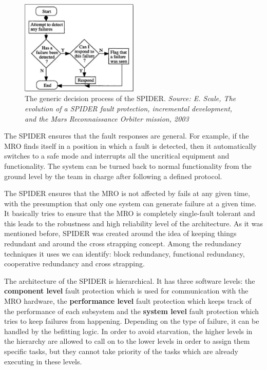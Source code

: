 \begin{figure}[htb]
	\begin{center}
	\includegraphics[width=0.5\textwidth]{img/spider.png}
	\caption{The generic decision process of the SPIDER. \small{\textit{Source: E.
	Scale, The evolution of a {SPIDER} fault protection, incremental development,
	and the {Mars Reconnaissance Orbiter} mission, 2003}}}
	\label{fig:spider}
	\end{center}
\end{figure}

The SPIDER ensures that the fault responses are general. For example, if the MRO
finds itself in a position in which a fault is detected, then it automatically
switches to a safe mode and interrupts all the uncritical equipment and
functionality. The system can be turned back to normal functionality from the
ground level by the team in charge after following a defined protocol.

The SPIDER ensures that the MRO is not affected by fails at any given time, with
the presumption that only one system can generate failure at a given time. It
basically tries to ensure that the MRO is completely single-fault tolerant and
this leads to the robustness and high reliability level of the architecture. As
it was mentioned before, SPIDER was created around the idea of keeping things
redundant and around the cross strapping concept. Among the redundancy
techniques it uses we can identify: block redundancy, functional redundancy,
cooperative redundancy and cross strapping.

The architecture of the SPIDER is hierarchical. It has three software levels:
the \textbf{component level} fault protection which is used for communication
with the MRO hardware, the \textbf{performance level} fault protection which
keeps track of the performance of each subsystem and the \textbf{system level}
fault protection which tries to keep failures from happening. Depending on the
type of failure, it can be handled by the befitting logic. In order to avoid
starvation, the higher levels in the hierarchy are allowed to call on to the
lower levels in order to assign them specific tasks, but they cannot take
priority of the tasks which are already executing in these levels.

